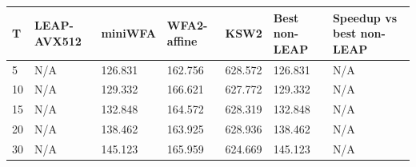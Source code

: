 \begin{tabular}{lllllll}
\hline
T & LEAP-AVX512 & miniWFA & WFA2-affine & KSW2 & Best non-LEAP & Speedup vs best non-LEAP \\
\hline
5 & N/A & 126.831 & 162.756 & 628.572 & 126.831 & N/A \\
10 & N/A & 129.332 & 166.621 & 627.772 & 129.332 & N/A \\
15 & N/A & 132.848 & 164.572 & 628.319 & 132.848 & N/A \\
20 & N/A & 138.462 & 163.925 & 628.936 & 138.462 & N/A \\
30 & N/A & 145.123 & 165.959 & 624.669 & 145.123 & N/A \\
\hline
\end{tabular}
